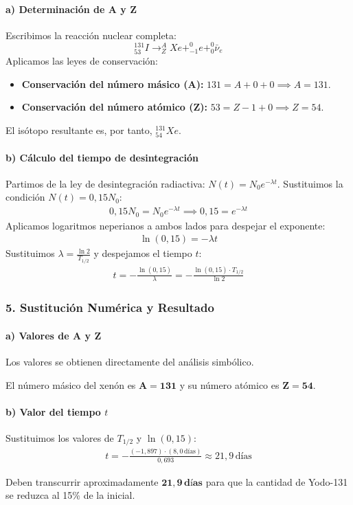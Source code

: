\paragraph*{a) Determinación de A y Z}
Escribimos la reacción nuclear completa:
$$ ^{131}_{53}I \rightarrow ^{A}_{Z}Xe + ^{0}_{-1}e + ^{0}_{0}\bar{\nu}_e $$
Aplicamos las leyes de conservación:
\begin{itemize}
    \item \textbf{Conservación del número másico (A):} $131 = A + 0 + 0 \implies A = 131$.
    \item \textbf{Conservación del número atómico (Z):} $53 = Z - 1 + 0 \implies Z = 54$.
\end{itemize}
El isótopo resultante es, por tanto, $^{131}_{54}Xe$.

\paragraph*{b) Cálculo del tiempo de desintegración}
Partimos de la ley de desintegración radiactiva: $N(t) = N_0 e^{-\lambda t}$.
Sustituimos la condición $N(t) = 0,15 N_0$:
\begin{gather}
    0,15 N_0 = N_0 e^{-\lambda t} \implies 0,15 = e^{-\lambda t}
\end{gather}
Aplicamos logaritmos neperianos a ambos lados para despejar el exponente:
\begin{gather}
    \ln(0,15) = -\lambda t
\end{gather}
Sustituimos $\lambda = \frac{\ln 2}{T_{1/2}}$ y despejamos el tiempo $t$:
\begin{gather}
    t = -\frac{\ln(0,15)}{\lambda} = -\frac{\ln(0,15) \cdot T_{1/2}}{\ln 2}
\end{gather}

\subsubsection*{5. Sustitución Numérica y Resultado}
\paragraph*{a) Valores de A y Z}
Los valores se obtienen directamente del análisis simbólico.
\begin{cajaresultado}
    El número másico del xenón es $\boldsymbol{A=131}$ y su número atómico es $\boldsymbol{Z=54}$.
\end{cajaresultado}

\paragraph*{b) Valor del tiempo $t$}
Sustituimos los valores de $T_{1/2}$ y $\ln(0,15)$:
\begin{gather}
    t = -\frac{(-1,897) \cdot (8,0 \, \text{días})}{0,693} \approx 21,9 \, \text{días}
\end{gather}
\begin{cajaresultado}
    Deben transcurrir aproximadamente $\boldsymbol{21,9 \, \textbf{días}}$ para que la cantidad de Yodo-131 se reduzca al 15\% de la inicial.
\end{cajaresultado}

